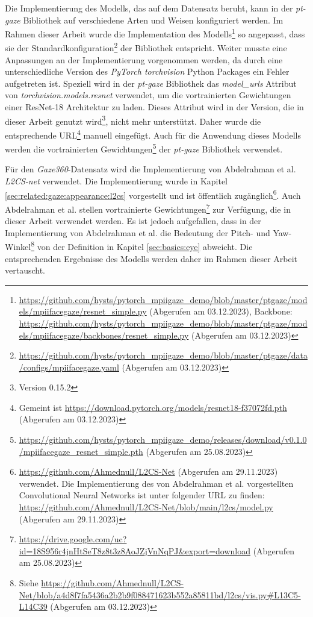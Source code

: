 Die Implementierung des Modells, das auf dem \mpii Datensatz beruht, kann in der \textit{pt-gaze} Bibliothek auf verschiedene Arten und Weisen konfiguriert werden. Im Rahmen dieser Arbeit wurde die Implementation des Modells\footnote{\url{https://github.com/hysts/pytorch_mpiigaze_demo/blob/master/ptgaze/models/mpiifacegaze/resnet_simple.py} (Abgerufen am 03.12.2023), Backbone: \url{https://github.com/hysts/pytorch_mpiigaze_demo/blob/master/ptgaze/models/mpiifacegaze/backbones/resnet_simple.py} (Abgerufen am 03.12.2023)} so angepasst, dass sie der Standardkonfiguration\footnote{\url{https://github.com/hysts/pytorch_mpiigaze_demo/blob/master/ptgaze/data/configs/mpiifacegaze.yaml} (Abgerufen am 03.12.2023)} der Bibliothek entspricht. Weiter musste eine Anpassungen an der Implementierung vorgenommen werden, da durch eine unterschiedliche Version des \textit{PyTorch torchvision} Python Packages ein Fehler aufgetreten ist. Speziell wird in der \textit{pt-gaze} Bibliothek das \textit{model\_urls} Attribut von \textit{torchvision.models.resnet} verwendet, um die vortrainierten Gewichtungen einer ResNet-18 Architektur zu laden. Dieses Attribut wird in der Version, die in dieser Arbeit genutzt wird\footnote{Version 0.15.2}, nicht mehr unterstützt. Daher wurde die entsprechende URL\footnote{Gemeint ist \url{https://download.pytorch.org/models/resnet18-f37072fd.pth} (Abgerufen am 03.12.2023)} manuell eingefügt. Auch für die Anwendung dieses Modells werden die vortrainierten Gewichtungen\footnote{\url{https://github.com/hysts/pytorch_mpiigaze_demo/releases/download/v0.1.0/mpiifacegaze_resnet_simple.pth} (Abgerufen am 25.08.2023)} der \textit{pt-gaze} Bibliothek verwendet. 

Für den \textit{Gaze360}-Datensatz wird die Implementierung von Abdelrahman et al. \textit{L2CS-net} \cite{paper:l2csnet} verwendet. Die Implementierung wurde in Kapitel \ref{sec:related:gaze:appearance:l2cs} vorgestellt und ist öffentlich zugänglich\footnote{\url{https://github.com/Ahmednull/L2CS-Net} (Abgerufen am 29.11.2023) verwendet. Die Implementierung des von Abdelrahman et al. vorgestellten Convolutional Neural Networks ist unter folgender URL zu finden: \url{https://github.com/Ahmednull/L2CS-Net/blob/main/l2cs/model.py} (Abgerufen am 29.11.2023)}. Auch Abdelrahman et al. stellen vortrainierte Gewichtungen\footnote{\url{https://drive.google.com/uc?id=18S956r4jnHtSeT8z8t3z8AoJZjVnNqPJ&export=download} (Abgerufen am 25.08.2023)} zur Verfügung, die in dieser Arbeit verwendet werden. Es ist jedoch aufgefallen, dass in der Implementierung von Abdelrahman et al. die Bedeutung der Pitch- und Yaw-Winkel\footnote{Siehe \url{https://github.com/Ahmednull/L2CS-Net/blob/a4d8f7fa5436a2b2b9f088471623b552a85811bd/l2cs/vis.py#L13C5-L14C39} (Abgerufen am 03.12.2023)} von der Definition in Kapitel \ref{sec:basics:eye} abweicht. Die entsprechenden Ergebnisse des Modells werden daher im Rahmen dieser Arbeit vertauscht.

